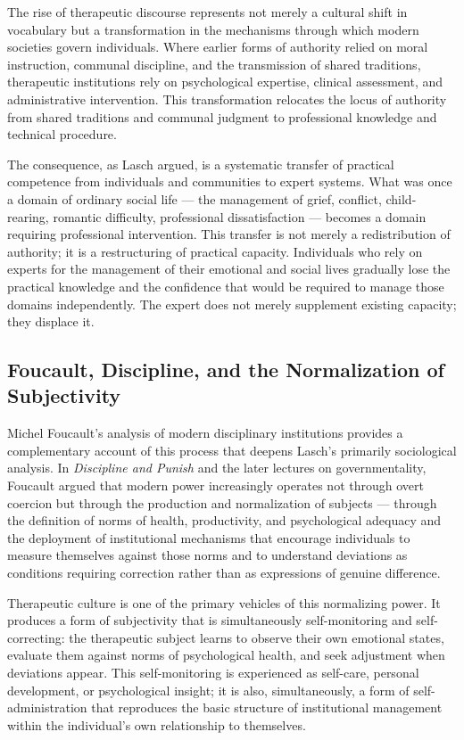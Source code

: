 \documentclass[12pt]{memoir}
\begin{document}
The rise of therapeutic discourse represents not merely a cultural shift in vocabulary
but a transformation in the mechanisms through which modern societies govern individuals.
Where earlier forms of authority relied on moral instruction, communal discipline, and
the transmission of shared traditions, therapeutic institutions rely on psychological
expertise, clinical assessment, and administrative intervention. This transformation
relocates the locus of authority from shared traditions and communal judgment to
professional knowledge and technical procedure.

The consequence, as Lasch argued, is a systematic transfer of practical competence from
individuals and communities to expert systems. What was once a domain of ordinary
social life — the management of grief, conflict, child-rearing, romantic difficulty,
professional dissatisfaction — becomes a domain requiring professional intervention.
This transfer is not merely a redistribution of authority; it is a restructuring of
practical capacity. Individuals who rely on experts for the management of their
emotional and social lives gradually lose the practical knowledge and the confidence
that would be required to manage those domains independently. The expert does not
merely supplement existing capacity; they displace it.

\subsection{Foucault, Discipline, and the Normalization of Subjectivity}

Michel Foucault's analysis of modern disciplinary institutions provides a complementary
account of this process that deepens Lasch's primarily sociological analysis.
In \textit{Discipline and Punish} and the later lectures on governmentality, Foucault
argued that modern power increasingly operates not through overt coercion but through
the production and normalization of subjects — through the definition of norms of
health, productivity, and psychological adequacy and the deployment of institutional
mechanisms that encourage individuals to measure themselves against those norms and to
understand deviations as conditions requiring correction rather than as expressions
of genuine difference.

Therapeutic culture is one of the primary vehicles of this normalizing power.
It produces a form of subjectivity that is simultaneously self-monitoring and
self-correcting: the therapeutic subject learns to observe their own emotional states,
evaluate them against norms of psychological health, and seek adjustment when
deviations appear. This self-monitoring is experienced as self-care, personal
development, or psychological insight; it is also, simultaneously, a form of
self-administration that reproduces the basic structure of institutional management
within the individual's own relationship to themselves.
\end{document}
